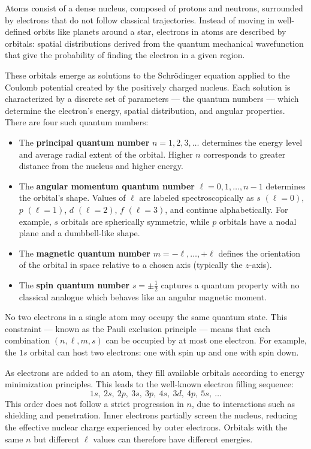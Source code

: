 Atoms consist of a dense nucleus, composed of protons and neutrons, surrounded by electrons that do not follow classical trajectories. Instead of moving in well-defined orbits like planets around a star, electrons in atoms are described by orbitals: spatial distributions derived from the quantum mechanical wavefunction that give the probability of finding the electron in a given region.

These orbitals emerge as solutions to the Schrödinger equation applied to the Coulomb potential created by the positively charged nucleus. Each solution is characterized by a discrete set of parameters — the quantum numbers — which determine the electron's energy, spatial distribution, and angular properties. There are four such quantum numbers:

\begin{itemize}[leftmargin=*]
  \item The \textbf{principal quantum number} $n = 1, 2, 3, \ldots$ determines the energy level and average radial extent of the orbital. Higher $n$ corresponds to greater distance from the nucleus and higher energy.
  \item The \textbf{angular momentum quantum number} $\ell = 0, 1, \ldots, n-1$ determines the orbital's shape. Values of $\ell$ are labeled spectroscopically as $s$ $(\ell=0)$, $p$ $(\ell=1)$, $d$ $(\ell=2)$, $f$ $(\ell=3)$, and continue alphabetically. For example, $s$ orbitals are spherically symmetric, while $p$ orbitals have a nodal plane and a dumbbell-like shape.
  \item The \textbf{magnetic quantum number} $m = -\ell, \ldots, +\ell$ defines the orientation of the orbital in space relative to a chosen axis (typically the $z$-axis).
  \item The \textbf{spin quantum number} $s = \pm \tfrac{1}{2}$ captures a quantum property with no classical analogue which behaves like an angular magnetic moment.
\end{itemize}

No two electrons in a single atom may occupy the same quantum state. This constraint — known as the Pauli exclusion principle — means that each combination $(n, \ell, m, s)$ can be occupied by at most one electron. For example, the $1s$ orbital can host two electrons: one with spin up and one with spin down.

As electrons are added to an atom, they fill available orbitals according to energy minimization principles. This leads to the well-known electron filling sequence:
\[
1s,\ 2s,\ 2p,\ 3s,\ 3p,\ 4s,\ 3d,\ 4p,\ 5s,\ \ldots
\]
This order does not follow a strict progression in $n$, due to interactions such as shielding and penetration. Inner electrons partially screen the nucleus, reducing the effective nuclear charge experienced by outer electrons. Orbitals with the same $n$ but different $\ell$ values can therefore have different energies.

